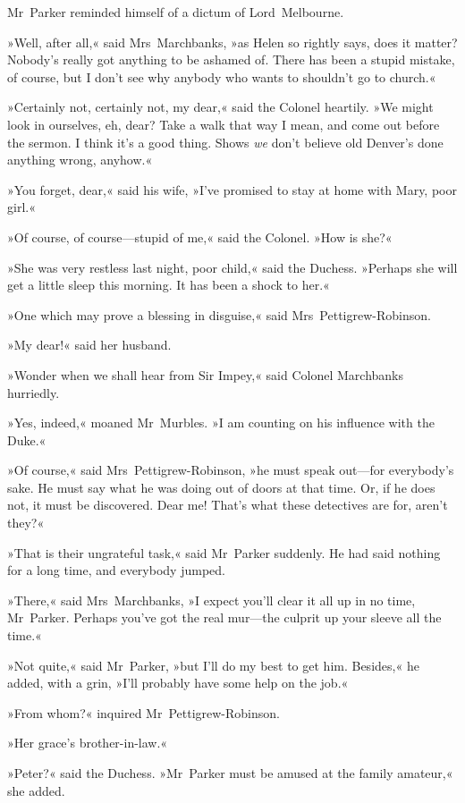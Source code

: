 Mr~Parker reminded himself of a dictum of Lord~Melbourne.

»Well, after all,« said Mrs~Marchbanks, »as Helen so rightly says, does it matter? Nobody's really got anything to be ashamed of. There has been a stupid mistake, of course, but I don't see why anybody who wants to shouldn't go to church.«

»Certainly not, certainly not, my dear,« said the Colonel heartily. »We might look in ourselves, eh, dear? Take a walk that way I mean, and come out before the sermon. I think it's a good thing. Shows \textit{we} don't believe old Denver's done anything wrong, anyhow.«

»You forget, dear,« said his wife, »I've promised to stay at home with Mary, poor girl.«

»Of course, of course—stupid of me,« said the Colonel. »How is she?«

»She was very restless last night, poor child,« said the Duchess.  »Perhaps she will get a little sleep this morning. It has been a shock to her.«

»One which may prove a blessing in disguise,« said Mrs~Pettigrew-Robinson.

»My dear!« said her husband.

»Wonder when we shall hear from Sir Impey,« said Colonel Marchbanks hurriedly.

»Yes, indeed,« moaned Mr~Murbles. »I am counting on his influence with the Duke.«

»Of course,« said Mrs~Pettigrew-Robinson, »he must speak out—for everybody's sake. He must say what he was doing out of doors at that time. Or, if he does not, it must be discovered. Dear me! That's what these detectives are for, aren't they?«

»That is their ungrateful task,« said Mr~Parker suddenly. He had said nothing for a long time, and everybody jumped.

»There,« said Mrs~Marchbanks, »I expect you'll clear it all up in no time, Mr~Parker. Perhaps you've got the real mur—the culprit up your sleeve all the time.«

»Not quite,« said Mr~Parker, »but I'll do my best to get him.  Besides,« he added, with a grin, »I'll probably have some help on the job.«

»From whom?« inquired Mr~Pettigrew-Robinson.

»Her grace's brother-in-law.«

»Peter?« said the Duchess. »Mr~Parker must be amused at the family amateur,« she added.

